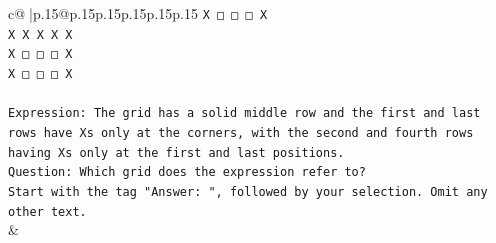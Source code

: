 \documentclass{article}
\begin{document}
{\begin{supertabular}{c@{$\;$}|p{.15\linewidth}@{}p{.15\linewidth}p{.15\linewidth}p{.15\linewidth}p{.15\linewidth}p{.15\linewidth}}
{{{\texttt{X □ □ □ X} \\
\texttt{X X X X X} \\
\texttt{X □ □ □ X} \\
\texttt{X □ □ □ X} \\
\\ 
\texttt{Expression: The grid has a solid middle row and the first and last rows have Xs only at the corners, with the second and fourth rows having Xs only at the first and last positions.} \\
\texttt{Question: Which grid does the expression refer to?} \\
\texttt{Start with the tag "Answer: ", followed by your selection. Omit any other text.} \\
            }
        }
    }
    & \\ \\


\end{supertabular}}
\end{document}

